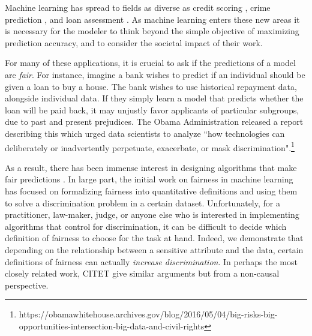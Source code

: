 Machine learning has spread to fields as diverse as credit scoring \cite{khandani2010consumer}, crime prediction \cite{brennan2009evaluating}, and loan assessment \cite{mahoney2007method}. As
machine learning enters these new areas it is necessary for the
modeler to think beyond the simple objective of maximizing prediction
accuracy, and to consider the societal impact of their work.

For many of these applications, it is crucial to
ask if the predictions of a model are
\emph{fair}. For instance, imagine a bank wishes to predict if an individual should be given
a loan to buy a house. The bank wishes to use historical repayment data, alongside  individual data. If they simply learn a model
that  predicts whether the
loan will be paid back, it may unjustly favor
applicants of particular subgroups, due to past and
present prejudices. The Obama Administration released a report
describing this which urged data scientists to
analyze ``how technologies can deliberately or inadvertently
perpetuate, exacerbate, or mask
discrimination".\footnote{https://obamawhitehouse.archives.gov/blog/2016/05/04/big-risks-big-opportunities-intersection-big-data-and-civil-rights}

As a result, there has been immense interest in designing
algorithms that make fair predictions
\cite{hardt2016equality,dwork2012fairness,joseph2016rawlsian,kamishima2011fairness,zliobaite2015survey,zafar2016fairness,zafar2015learning,grgiccase,kleinberg2016inherent,calders2010three,kamiran2012data,bolukbasi2016man,kamiran2009classifying,zemel2013learning,louizos2015variational}. 
In large part, the initial work on fairness in machine learning has
focused on formalizing fairness into quantitative definitions and using them to solve a
discrimination problem in a certain dataset. Unfortunately, for a
practitioner, law-maker, judge, or anyone else who is interested in
implementing algorithms that control for discrimination, it can be
difficult to decide which definition of fairness to choose for the
task at hand. Indeed, we demonstrate that depending on the
relationship between a sensitive attribute and the data, certain
definitions of fairness can actually \emph{increase discrimination}.
In perhaps the most closely related work, CITET give similar arguments
but from a non-causal perspective.

